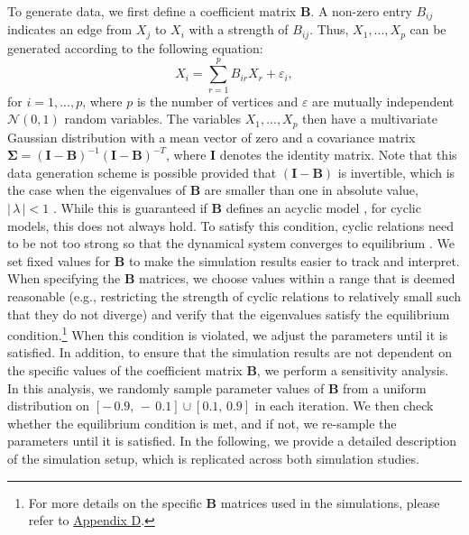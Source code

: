 \documentclass[twoside, 11pt]{article}
\begin{document}
To generate data, we first define a coefficient matrix $\mathbf{B}$. A non-zero entry $B_{ij}$ indicates an edge from $X_j$ to $X_i$ with a strength of $B_{ij}$. Thus, $X_1, ... , X_p$ can be generated according to the following equation:
$$X_i = \sum_{r=1}^{p}B_{ir}X_r + \varepsilon_i,$$
for $i = 1, ..., p$, where $p$ is the number of vertices and $\varepsilon$ are mutually independent $\mathcal{N}(0,1)$ random variables.
The variables $X_1, ..., X_p$ then have a multivariate Gaussian distribution with a mean vector of zero and a covariance matrix $\mathbf{\Sigma} = (\mathbf{I} - \mathbf{B})^{-1} (\mathbf{I} - \mathbf{B})^{-T}$, where $\mathbf{I}$ denotes the identity matrix.
Note that this data generation scheme is possible provided that $(\mathbf{I} - \mathbf{B})$ is invertible, which is the case when the eigenvalues of $\mathbf{B}$ are smaller than one in absolute value, $|\,\lambda\,| < 1$ \citep{eberhardt2010}. 
While this is guaranteed if $\mathbf{B}$ defines an acyclic model \citep{drton_structure_2017}, for cyclic models, this does not always hold. To satisfy this condition, cyclic relations need to be not too strong so that the dynamical system converges to equilibrium \citep{rothenhausler_backshift_2015}. We set fixed values for $\mathbf{B}$ to make the simulation results easier to track and interpret. When specifying the $\mathbf{B}$ matrices, we choose values within a range that is deemed reasonable (e.g., restricting the strength of cyclic relations to relatively small such that they do not diverge) and verify that the eigenvalues satisfy the equilibrium condition.\footnote{For more details on the specific $\mathbf{B}$ matrices used in the simulations, please refer to \hyperref[Bmatrix]{Appendix D}.} When this condition is violated, we adjust the parameters until it is satisfied. In addition, to ensure that the simulation results are not dependent on the specific values of the coefficient matrix $\mathbf{B}$, we perform a sensitivity analysis. In this analysis, we randomly sample parameter values of $\mathbf{B}$ from a uniform distribution on $[-\,0.9,\, -\,0.1] \cup [0.1, \, 0.9]$ in each iteration. We then check whether the equilibrium condition is met, and if not, we re-sample the parameters until it is satisfied.
In the following, we provide a detailed description of the simulation setup, which is replicated across both simulation studies.
\end{document}
